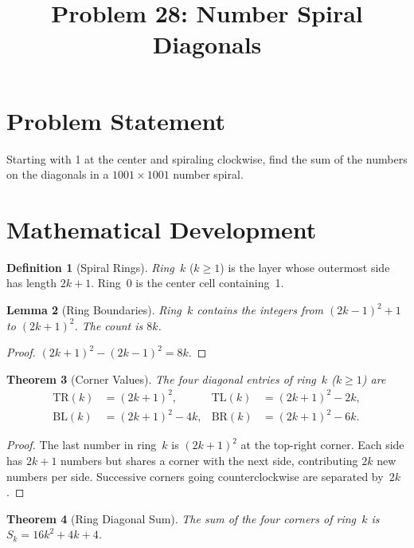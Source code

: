 \documentclass[12pt,a4paper]{article}
\title{Problem 28: Number Spiral Diagonals}
\author{}
\date{}
\newtheorem{theorem}{Theorem}
\newtheorem{lemma}[theorem]{Lemma}
\theoremstyle{definition}
\newtheorem{definition}[theorem]{Definition}
\begin{document}
\maketitle

\section{Problem Statement}

Starting with 1 at the center and spiraling clockwise, find the sum of the numbers on the diagonals in a $1001 \times 1001$ number spiral.

\section{Mathematical Development}

\begin{definition}[Spiral Rings]
\emph{Ring~$k$} ($k \geq 1$) is the layer whose outermost side has length $2k+1$. Ring~0 is the center cell containing~1.
\end{definition}

\begin{lemma}[Ring Boundaries]\label{lem:bounds}
Ring~$k$ contains the integers from $(2k-1)^2 + 1$ to $(2k+1)^2$. The count is $8k$.
\end{lemma}

\begin{proof}
$(2k+1)^2 - (2k-1)^2 = 8k$.
\end{proof}

\begin{theorem}[Corner Values]\label{thm:corners}
The four diagonal entries of ring~$k$ ($k \geq 1$) are
\begin{align*}
\mathrm{TR}(k) &= (2k+1)^2, & \mathrm{TL}(k) &= (2k+1)^2 - 2k, \\
\mathrm{BL}(k) &= (2k+1)^2 - 4k, & \mathrm{BR}(k) &= (2k+1)^2 - 6k.
\end{align*}
\end{theorem}

\begin{proof}
The last number in ring~$k$ is $(2k+1)^2$ at the top-right corner. Each side has $2k+1$ numbers but shares a corner with the next side, contributing $2k$ new numbers per side. Successive corners going counterclockwise are separated by~$2k$.
\end{proof}

\begin{theorem}[Ring Diagonal Sum]\label{thm:ringsum}
The sum of the four corners of ring~$k$ is $S_k = 16k^2 + 4k + 4$.
\end{theorem}
\end{document}
